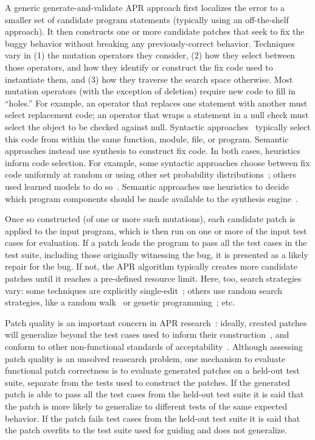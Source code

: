 \documentclass[conference]{IEEEtran}
\begin{document}
A generic generate-and-validate APR approach first
localizes the error to a smaller set of
candidate program statements (typically using an off-the-shelf approach).  It
then constructs one or more candidate patches that seek to fix the buggy
behavior without breaking any previously-correct behavior.  
Techniques vary in (1) the mutation operators they consider, (2) how they select
between those operators, and how they identify or
construct the fix code used to instantiate them, and (3) how they traverse
the search space otherwise.  
Most mutation operators (with the exception of deletion) require new code to
fill in ``holes.''  For example, an operator that replaces one statement with
another must select replacement code; an operator that wraps a statement
in a null check must select the object to be checked against null.
Syntactic approaches~\cite{examples} typically select this code from within the
same function, module, file, or program.  Semantic approaches instead use synthesis to
construct fix code.  
In both cases, heuristics inform code selection.  For example, some syntactic approaches
choose between fix code uniformly at random or using other set probability distributions~\cite{examples}; others used learned
models to do so~\cite{long16proph}.  Semantic approaches use heuristics to
decide which program components should be made available to the synthesis
engine~\cite{examples}. 

Once so constructed (of one or more such mutations), each candidate patch is
applied to the input program, which is then run on
one or more of the input test cases for evaluation.  If a patch leads the
program to 
pass all the test cases in the test suite, including those originally witnessing
the bug, it is presented as a likely repair for the bug. 
If not, the APR algorithm typically creates more candidate patches 
until it reaches a pre-defined resource limit. 
Here, too, search strategies vary: some techniques 
are explicitly single-edit~\cite{Qi13TrpAutoR,Weimer13,nopol}; others use
random search strategies, like a random walk~\cite{debroy10} or genetic
programming~\cite{kim2013,legoues12,xuan16}; etc. 

Patch quality is an important concern in APR research~\cite{cite}: ideally,
created patches will generalize beyond the test cases used to inform their
construction~\cite{Smith15fse}, and conform to other non-functional standards of
acceptability~\cite{zakmaintainbility,par}.  Although assessing patch quality is an
unsolved reasearch problem, one mechanism to evaluate functional patch
correctness is to evaluate generated patches on a held-out test suite, separate
from the tests used to construct the patches. 
If the generated patch is able to pass all the test cases
from the held-out test suite it is said that the patch is more likely to
generalize to different tests of the same expected behavior. If the patch fails
test cases from the held-out test suite it is said that the patch overfits to
the test suite used for guiding and does not generalize. 
\end{document}
